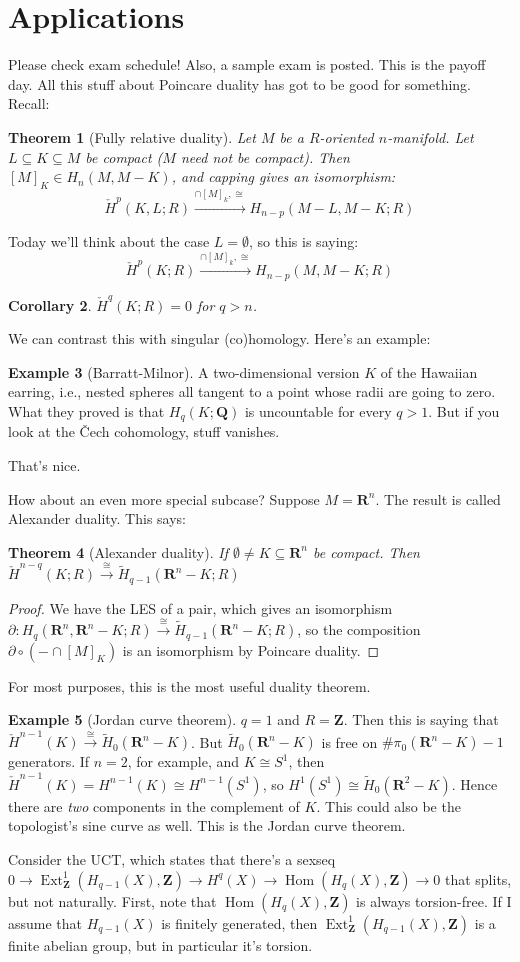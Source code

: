\documentclass{amsart}
\theoremstyle{theorem}
\newtheorem{theorem}{Theorem}[section]
\newtheorem{corollary}[theorem]{Corollary}
\theoremstyle{definition}
\newtheorem{example}[theorem]{Example}
\DeclareMathOperator{\Ext}{Ext}
\DeclareMathOperator{\Hom}{Hom}
\def\QQ{\mathbf Q}\def\RR{\mathbf R}\def\SS{\mathbb S}\def\TT{\mathbb T}
\newcommand\cHH{\check{H}}
\newcommand{\Z}{\mathbf Z}
\begin{document}
\section{Applications}
Please check exam schedule! Also, a sample exam is posted. This is the payoff day. All this stuff about Poincare duality has got to be good for something. Recall:
\begin{theorem}[Fully relative duality]
Let $M$ be a $R$-oriented $n$-manifold. Let $L\subseteq K\subseteq M$ be compact ($M$ need not be compact). Then $[M]_K\in H_n(M,M-K)$, and capping gives an isomorphism:
$$\cHH^p(K,L;R)\xrightarrow{\cap[M]_k,\cong}H_{n-p}(M-L,M-K;R)$$
\end{theorem}
Today we'll think about the case $L=\emptyset$, so this is saying:
$$\cHH^p(K;R)\xrightarrow{\cap[M]_k,\cong}H_{n-p}(M,M-K;R)$$
\begin{corollary}
$\cHH^q(K;R)=0$ for $q>n$.
\end{corollary}
We can contrast this with singular (co)homology. Here's an example:
\begin{example}[Barratt-Milnor]
A two-dimensional version $K$ of the Hawaiian earring, i.e., nested spheres all tangent to a point whose radii are going to zero. What they proved is that $H_q(K;\QQ)$ is uncountable for every $q>1$. But if you look at the \v{C}ech cohomology, stuff vanishes.
\end{example}
That's nice.

How about an even more special subcase? Suppose $M=\RR^n$. The result is called Alexander duality. This says:
\begin{theorem}[Alexander duality]
If $\emptyset\neq K\subseteq \RR^n$ be compact. Then $\cHH^{n-q}(K;R)\xrightarrow{\cong}\widetilde{H}_{q-1}(\RR^n-K;R)$
\end{theorem}
\begin{proof}
We have the LES of a pair, which gives an isomorphism $\partial:H_q(\RR^n,\RR^n-K;R)\xrightarrow{\cong}\widetilde{H}_{q-1}(\RR^n-K;R)$, so the composition $\partial\circ(-\cap[M]_K)$ is an isomorphism by Poincare duality.
\end{proof}
For most purposes, this is the most useful duality theorem.
\begin{example}[Jordan curve theorem]
$q=1$ and $R=\Z$. Then this is saying that $\cHH^{n-1}(K)\xrightarrow{\cong}\widetilde{H}_0(\RR^n-K)$. But $\widetilde{H}_0(\RR^n-K)$ is free on $\#\pi_0(\RR^n-K)-1$ generators. If $n=2$, for example, and $K\cong S^1$, then $\cHH^{n-1}(K)=H^{n-1}(K)\cong H^{n-1}(S^1)$, so $H^1(S^1)\cong \widetilde{H}_0(\RR^2-K)$. Hence there are \emph{two} components in the complement of $K$. This could also be the topologist's sine curve as well. This is the Jordan curve theorem.
\end{example}
Consider the UCT, which states that there's a sexseq $0\to\Ext^1_\Z(H_{q-1}(X),\Z)\to H^q(X)\to\Hom(H_q(X),\Z)\to 0$ that splits, but not naturally. First, note that $\Hom(H_q(X),\Z)$ is always torsion-free. If I assume that $H_{q-1}(X)$ is finitely generated, then $\Ext^1_\Z(H_{q-1}(X),\Z)$ is a finite abelian group, but in particular it's torsion.
\end{document}

